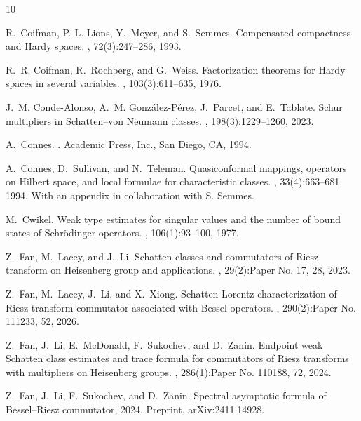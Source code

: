 \documentclass[reqno]{amsart}
\theoremstyle{plain}
\theoremstyle{definition}
\theoremstyle{remark}
\begin{document}
\begin{thebibliography}{10}

R.~Coifman, P.-L. Lions, Y.~Meyer, and S.~Semmes.
\newblock Compensated compactness and {H}ardy spaces.
, 72(3):247--286, 1993.

R.~R. Coifman, R.~Rochberg, and G.~Weiss.
\newblock Factorization theorems for {H}ardy spaces in several variables.
, 103(3):611--635, 1976.

J.~M. Conde-Alonso, A.~M. Gonz\'alez-P\'erez, J.~Parcet, and E.~Tablate.
\newblock Schur multipliers in {S}chatten--von {N}eumann classes.
, 198(3):1229--1260, 2023.

A.~Connes.
.
\newblock Academic Press, Inc., San Diego, CA, 1994.

A.~Connes, D.~Sullivan, and N.~Teleman.
\newblock Quasiconformal mappings, operators on {H}ilbert space, and local
  formulae for characteristic classes.
, 33(4):663--681, 1994.
\newblock With an appendix in collaboration with S. Semmes.

M.~Cwikel.
\newblock Weak type estimates for singular values and the number of bound
  states of {S}chr\"odinger operators.
, 106(1):93--100, 1977.

Z.~Fan, M.~Lacey, and J.~Li.
\newblock Schatten classes and commutators of {R}iesz transform on {H}eisenberg
  group and applications.
, 29(2):Paper No. 17, 28, 2023.

Z.~Fan, M.~Lacey, J.~Li, and X.~Xiong.
\newblock Schatten-{L}orentz characterization of {R}iesz transform commutator
  associated with {B}essel operators.
, 290(2):Paper No. 111233, 52, 2026.

Z.~Fan, J.~Li, E.~McDonald, F.~Sukochev, and D.~Zanin.
\newblock Endpoint weak {S}chatten class estimates and trace formula for
  commutators of {R}iesz transforms with multipliers on {H}eisenberg groups.
, 286(1):Paper No. 110188, 72, 2024.

Z.~Fan, J.~Li, F.~Sukochev, and D.~Zanin.
\newblock Spectral asymptotic formula of {B}essel--{R}iesz commutator, 2024.
\newblock Preprint, arXiv:2411.14928.


\end{thebibliography}
\end{document}
